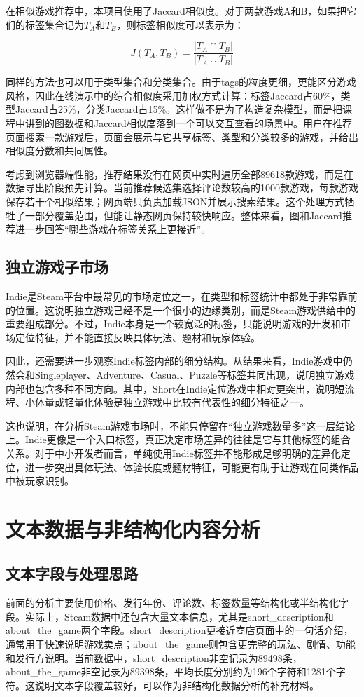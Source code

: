 \documentclass[UTF8,a4paper,12pt,fontset=fandol]{ctexart}
\begin{document}
在相似游戏推荐中，本项目使用了Jaccard相似度。对于两款游戏A和B，如果把它们的标签集合记为$T_A$和$T_B$，则标签相似度可以表示为：

\[
J(T_A,T_B)=\frac{|T_A \cap T_B|}{|T_A \cup T_B|}
\]

同样的方法也可以用于类型集合和分类集合。由于tags的粒度更细，更能区分游戏风格，因此在线演示中的综合相似度采用加权方式计算：标签Jaccard占60\%，类型Jaccard占25\%，分类Jaccard占15\%。这样做不是为了构造复杂模型，而是把课程中讲到的图数据和Jaccard相似度落到一个可以交互查看的场景中。用户在推荐页面搜索一款游戏后，页面会展示与它共享标签、类型和分类较多的游戏，并给出相似度分数和共同属性。

考虑到浏览器端性能，推荐结果没有在网页中实时遍历全部89618款游戏，而是在数据导出阶段预先计算。当前推荐候选集选择评论数较高的1000款游戏，每款游戏保存若干个相似结果；网页端只负责加载JSON并展示搜索结果。这个处理方式牺牲了一部分覆盖范围，但能让静态网页保持较快响应。整体来看，图和Jaccard推荐进一步回答“哪些游戏在标签关系上更接近”。

\subsection{独立游戏子市场}
Indie是Steam平台中最常见的市场定位之一，在类型和标签统计中都处于非常靠前的位置。这说明独立游戏已经不是一个很小的边缘类别，而是Steam游戏供给中的重要组成部分。不过，Indie本身是一个较宽泛的标签，只能说明游戏的开发和市场定位特征，并不能直接反映具体玩法、题材和玩家体验。

因此，还需要进一步观察Indie标签内部的细分结构。从结果来看，Indie游戏中仍然会和Singleplayer、Adventure、Casual、Puzzle等标签共同出现，说明独立游戏内部也包含多种不同方向。其中，Short在Indie定位游戏中相对更突出，说明短流程、小体量或轻量化体验是独立游戏中比较有代表性的细分特征之一。

这也说明，在分析Steam游戏市场时，不能只停留在“独立游戏数量多”这一层结论上。Indie更像是一个入口标签，真正决定市场差异的往往是它与其他标签的组合关系。对于中小开发者而言，单纯使用Indie标签并不能形成足够明确的差异化定位，进一步突出具体玩法、体验长度或题材特征，可能更有助于让游戏在同类作品中被玩家识别。

\section{文本数据与非结构化内容分析}

\subsection{文本字段与处理思路}
前面的分析主要使用价格、发行年份、评论数、标签数量等结构化或半结构化字段。实际上，Steam数据中还包含大量文本信息，尤其是short\_description和about\_the\_game两个字段。short\_description更接近商店页面中的一句话介绍，通常用于快速说明游戏卖点；about\_the\_game则包含更完整的玩法、剧情、功能和发行方说明。当前数据中，short\_description非空记录为89498条，about\_the\_game非空记录为89398条，平均长度分别约为196个字符和1281个字符。这说明文本字段覆盖较好，可以作为非结构化数据分析的补充材料。
\end{document}
